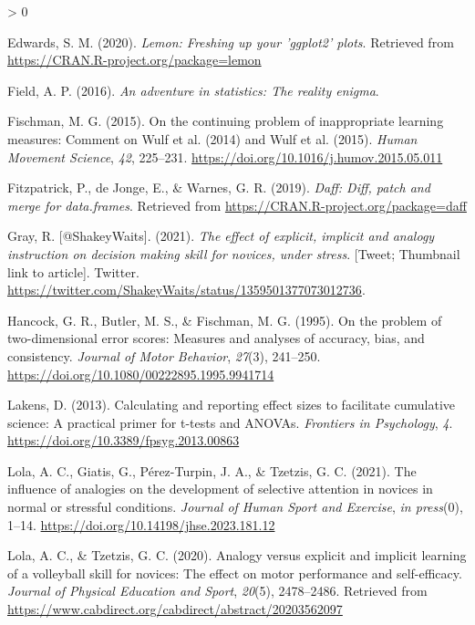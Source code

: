 \documentclass[
  english,
  man, donotrepeattitle,floatsintext]{apa7}
\newlength{\cslhangindent}
\newenvironment{CSLReferences}[2] %
 {%
  \setlength{\parindent}{0pt}
  \ifodd #1 \everypar{\setlength{\hangindent}{\cslhangindent}}\ignorespaces\fi
  \ifnum #2 > 0
  \setlength{\parskip}{#2\baselineskip}
  \fi
 }%
 {}
\begin{document}
\begin{CSLReferences}{1}{0}
\leavevmode\hypertarget{ref-R-lemon}{}%
Edwards, S. M. (2020). \emph{Lemon: Freshing up your 'ggplot2' plots}. Retrieved from \url{https://CRAN.R-project.org/package=lemon}

\leavevmode\hypertarget{ref-field2016}{}%
Field, A. P. (2016). \emph{An adventure in statistics: The reality enigma}.

\leavevmode\hypertarget{ref-fischman2015}{}%
Fischman, M. G. (2015). On the continuing problem of inappropriate learning measures: Comment on Wulf et al. (2014) and Wulf et al. (2015). \emph{Human Movement Science}, \emph{42}, 225--231. \url{https://doi.org/10.1016/j.humov.2015.05.011}

\leavevmode\hypertarget{ref-R-daff}{}%
Fitzpatrick, P., de Jonge, E., \& Warnes, G. R. (2019). \emph{Daff: Diff, patch and merge for data.frames}. Retrieved from \url{https://CRAN.R-project.org/package=daff}

\leavevmode\hypertarget{ref-gray2021}{}%
Gray, R. {[}@ShakeyWaits{]}. (2021). \emph{The effect of explicit, implicit and analogy instruction on decision making skill for novices, under stress}. {[}Tweet; Thumbnail link to article{]}. Twitter. \url{https://twitter.com/ShakeyWaits/status/1359501377073012736}.

\leavevmode\hypertarget{ref-hancock1995}{}%
Hancock, G. R., Butler, M. S., \& Fischman, M. G. (1995). On the problem of two-dimensional error scores: Measures and analyses of accuracy, bias, and consistency. \emph{Journal of Motor Behavior}, \emph{27}(3), 241--250. \url{https://doi.org/10.1080/00222895.1995.9941714}

\leavevmode\hypertarget{ref-lakens2013}{}%
Lakens, D. (2013). Calculating and reporting effect sizes to facilitate cumulative science: A practical primer for t-tests and ANOVAs. \emph{Frontiers in Psychology}, \emph{4}. \url{https://doi.org/10.3389/fpsyg.2013.00863}

\leavevmode\hypertarget{ref-lola2021b}{}%
Lola, A. C., Giatis, G., Pérez-Turpin, J. A., \& Tzetzis, G. C. (2021). The influence of analogies on the development of selective attention in novices in normal or stressful conditions. \emph{Journal of Human Sport and Exercise}, \emph{in press}(0), 1--14. \url{https://doi.org/10.14198/jhse.2023.181.12}

\leavevmode\hypertarget{ref-lola2020}{}%
Lola, A. C., \& Tzetzis, G. C. (2020). Analogy versus explicit and implicit learning of a volleyball skill for novices: The effect on motor performance and self-efficacy. \emph{Journal of Physical Education and Sport}, \emph{20}(5), 2478--2486. Retrieved from \url{https://www.cabdirect.org/cabdirect/abstract/20203562097}


\end{CSLReferences}
\end{document}
